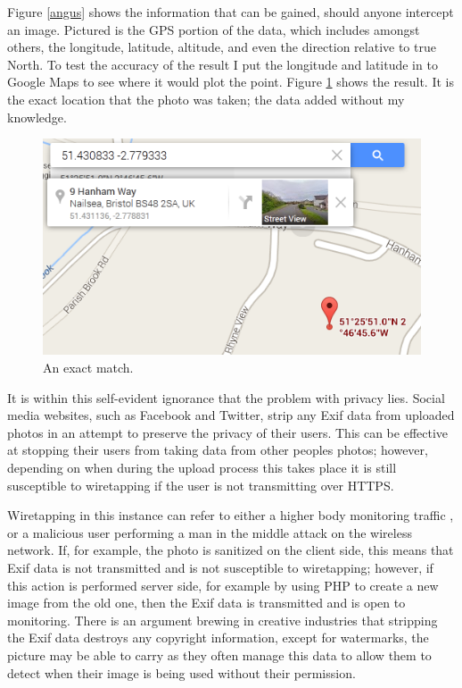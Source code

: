 Figure \ref{angus} shows the information that can be gained, should anyone intercept an image. Pictured is the GPS portion of the data, which includes amongst others, the longitude, latitude, altitude, and even the direction relative to true North. To test the accuracy of the result I put the longitude and latitude in to Google Maps to see where it would plot the point. Figure \ref{gmaps} shows the result. It is the exact location that the photo was taken; the data added without my knowledge.

\begin{figure}[htb!]
\centering\includegraphics{intro/diagrams/g-maps-location.png}
\caption{An exact match.}
\label{gmaps}
\end{figure}

It is within this self-evident ignorance that the problem with privacy lies. Social media websites, such as Facebook and Twitter, strip any Exif data \cite{intro:twitter_exif} from uploaded photos in an attempt to preserve the privacy of their users. This can be effective at stopping their users from taking data from other peoples photos; however, depending on when during the upload process this takes place it is still susceptible to wiretapping if the user is not transmitting over HTTPS. 

Wiretapping in this instance can refer to either a higher body monitoring traffic \cite{intro:room_641a}, or a malicious user performing a man in the middle attack on the wireless network. If, for example, the photo is sanitized on the client side, this means that Exif data is not transmitted and is not susceptible to wiretapping; however, if this action is performed server side, for example by using PHP to create a new image from the old one, then the Exif data is transmitted and is open to monitoring. There is an argument brewing in creative industries that stripping the Exif data destroys any copyright information, except for watermarks, the picture may be able to carry as they often manage this data to allow them to detect when their image is being used without their permission.

